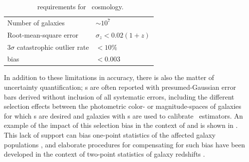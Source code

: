\begin{table}
	\begin{tabular}{ll}
		Number of galaxies & $\sim 10^{7}$\\
		Root-mean-square error & $\sigma_z < 0.02 (1+z)$\\
		$3 \sigma$ catastrophic outlier rate & $< 10\%$\\
		bias & $< 0.003$
	\end{tabular}
\caption{\Pz\ requirements for \lsst\ cosmology.}
\end{table}

In addition to these limitations in accuracy, there is also the matter of uncertainty quantification; \pz s are often reported with presumed-Gaussian error bars derived without inclusion of all systematic errors, including the different selection effects between the photometric color- or magnitude-spaces of galaxies for which \pz s are desired and galaxies with \sz s are used to calibrate \pz\ estimators.
An example of the impact of this selection bias in the context of \citep[][]{lilly_zcosmos_2009} and \citep[][]{laigle_cosmos2015_2016} is shown in .
This lack of support can bias one-point statistics of the affected galaxy populations \citep{moresco_spot_2013}, and elaborate procedures for compensating for such bias have been developed in the context of two-point statistics of galaxy redshifts \citep{mandelbaum_precision_2008}.

